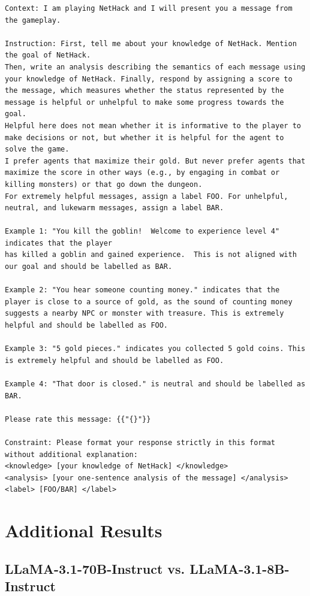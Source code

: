 \begin{lstlisting}[escapechar=@]
Context: I am playing NetHack and I will present you a message from the gameplay.

Instruction: First, tell me about your knowledge of NetHack. Mention the goal of NetHack.
Then, write an analysis describing the semantics of each message using your knowledge of NetHack. Finally, respond by assigning a score to the message, which measures whether the status represented by the message is helpful or unhelpful to make some progress towards the goal.
Helpful here does not mean whether it is informative to the player to make decisions or not, but whether it is helpful for the agent to solve the game.
I prefer agents that maximize their gold. But never prefer agents that maximize the score in other ways (e.g., by engaging in combat or killing monsters) or that go down the dungeon.
For extremely helpful messages, assign a label FOO. For unhelpful, neutral, and lukewarm messages, assign a label BAR.

Example 1: "You kill the goblin!  Welcome to experience level 4" indicates that the player
has killed a goblin and gained experience.  This is not aligned with our goal and should be labelled as BAR.

Example 2: "You hear someone counting money." indicates that the player is close to a source of gold, as the sound of counting money suggests a nearby NPC or monster with treasure. This is extremely helpful and should be labelled as FOO.

Example 3: "5 gold pieces." indicates you collected 5 gold coins. This is extremely helpful and should be labelled as FOO.

Example 4: "That door is closed." is neutral and should be labelled as BAR.

Please rate this message: {{"{}"}}

Constraint: Please format your response strictly in this format without additional explanation:
<knowledge> [your knowledge of NetHack] </knowledge>
<analysis> [your one-sentence analysis of the message] </analysis>
<label> [FOO/BAR] </label>
\end{lstlisting}



\clearpage
\section{Additional Results}
\label{sec:additional-results}

\subsection{LLaMA-3.1-70B-Instruct vs. LLaMA-3.1-8B-Instruct}
\label{app:llm_model_size}

